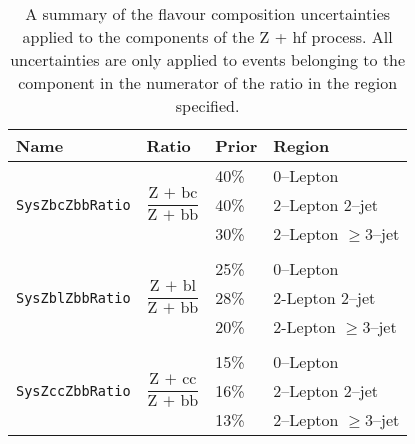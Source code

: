 \begin{table}[!htbp]
  \centering
  \begin{tabular}{llll}
    \toprule
    {\bfseries Name} & {\bfseries Ratio} & {\bfseries Prior} & {\bfseries Region}\\ 
    \midrule
    \multirow{ 3}{*}{\texttt{SysZbcZbbRatio}} & \multirow{ 3}{*}{$\dfrac{\text{Z + bc}}{\text{Z + bb}}$} & 40\% & 0--Lepton \\
                     &								    & 40\% & 2--Lepton 2--jet \\
                     &								    & 30\% & 2--Lepton $\geq$3--jet \\
                     & & & \\
    \multirow{ 3}{*}{\texttt{SysZblZbbRatio}} & \multirow{ 3}{*}{$\dfrac{\text{Z + bl}}{\text{Z + bb}}$} & 25\% & 0--Lepton \\
                     &								    & 28\% & 2-Lepton 2--jet \\
                     &								    & 20\% & 2-Lepton $\geq$3--jet \\
                     & & & \\
    \multirow{ 3}{*}{\texttt{SysZccZbbRatio}}    & \multirow{ 3}{*}{$\dfrac{\text{Z + cc}}{\text{Z + bb}}$} & 15\% & 0--Lepton \\
                     &								    &  16\% & 2--Lepton 2--jet \\
                     &								    &   13\% & 2--Lepton $\geq$3--jet \\
    \bottomrule
  \end{tabular}
  \caption[$Z+$jets flavour composition uncertainties.]{A summary of the flavour
    composition uncertainties applied to the components of the Z + hf process.
    All uncertainties are only applied to events belonging to the component in
    the numerator of the ratio in the region specified.}
  \label{tab:zjets-flavour-comp}
\end{table}